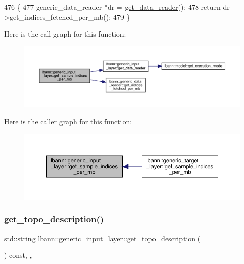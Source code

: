 \begin{DoxyCode}
476                                                         \{
477     generic\_data\_reader *dr = \hyperlink{classlbann_1_1generic__input__layer_aba732becdb02627e3ad4493ac19e8fb6}{get\_data\_reader}();
478     \textcolor{keywordflow}{return} dr->get\_indices\_fetched\_per\_mb();
479   \}
\end{DoxyCode}
Here is the call graph for this function\+:\nopagebreak
\begin{figure}[H]
\begin{center}
\leavevmode
\includegraphics[width=350pt]{classlbann_1_1generic__input__layer_a749741781204b17c8ca172a9a405a90e_cgraph}
\end{center}
\end{figure}
Here is the caller graph for this function\+:\nopagebreak
\begin{figure}[H]
\begin{center}
\leavevmode
\includegraphics[width=350pt]{classlbann_1_1generic__input__layer_a749741781204b17c8ca172a9a405a90e_icgraph}
\end{center}
\end{figure}
\mbox{\label{classlbann_1_1generic__input__layer_a36d9962105ca89889e3f38f1c1801560}} 
\subsubsection{\texorpdfstring{get\+\_\+topo\+\_\+description()}{get\_topo\_description()}}
{\footnotesize\ttfamily std\+::string lbann\+::generic\+\_\+input\+\_\+layer\+::get\+\_\+topo\+\_\+description (\begin{DoxyParamCaption}{ }\end{DoxyParamCaption}) const\hspace{0.3cm}{\ttfamily [inline]}, {\ttfamily [override]}, {\ttfamily [virtual]}}

